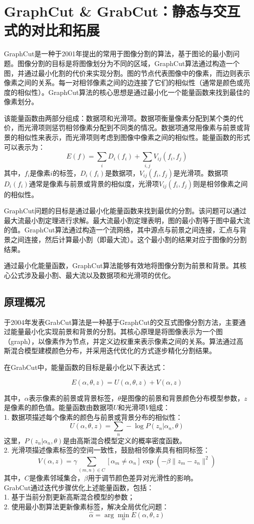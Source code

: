 \documentclass[UTF8]{ctexart}
\begin{document}
\section{GraphCut \& GrabCut：静态与交互式的对比和拓展}
GraphCut是一种于2001年提出的常用于图像分割的算法\cite{boykov_interactive_2001}，基于图论的最小割问题。图像分割的目标是将图像划分为不同的区域，GraphCut算法通过构造一个图，并通过最小化割的代价来实现分割。图的节点代表图像中的像素，而边则表示像素之间的关系。每一对相邻像素之间的边连接了它们的相似性（通常是颜色或亮度的相似性）。GraphCut算法的核心思想是通过最小化一个能量函数来找到最佳的像素划分。\par
该能量函数由两部分组成：数据项和光滑项。数据项衡量像素分配到某个类的代价，而光滑项则惩罚相邻像素分配到不同类的情况。数据项通常用像素与前景或背景的相似性来表示，而光滑项则考虑到图像中像素之间的相似性。能量函数的形式可以表示为：
\[
E(f) = \sum_i D_i(f_i) + \sum_{i,j} V_{ij}(f_i, f_j)
\]
其中，$f_i$是像素$i$的标签，$D_i(f_i)$是数据项，$V_{ij}(f_i, f_j)$是光滑项。数据项$D_i(f_i)$通常是像素与前景或背景的相似度，光滑项$V_{ij}(f_i, f_j)$则是相邻像素之间的相似性。\par
GraphCut问题的目标是通过最小化能量函数来找到最优的分割。该问题可以通过最大流最小割定理进行求解。最大流最小割定理表明，图的最小割等于图中最大流的值。GraphCut算法通过构造一个流网络，其中源点与前景之间连接，汇点与背景之间连接，然后计算最小割（即最大流）。这个最小割的结果对应于图像的分割结果。\par
通过最小化能量函数，GraphCut算法能够有效地将图像分割为前景和背景。其核心公式涉及最小割、最大流以及数据项和光滑项的优化。
\subsection{原理概况}
于2004年发表GrabCut算法是一种基于GraphCut的交互式图像分割方法\cite{rother_grabcut_2004}，主要通过能量最小化实现前景和背景的分割。其核心原理是将图像表示为一个图（graph），以像素作为节点，并定义边权重来表示像素之间的关系。算法通过高斯混合模型建模颜色分布，并采用迭代优化的方式逐步精化分割结果。\par
在GrabCut中，能量函数的目标是最小化以下表达式：

\[
E(\alpha, \theta, z) = U(\alpha, \theta, z) + V(\alpha, z)
\]

其中，$\alpha$表示像素的前景或背景标签，$\theta$是图像的前景和背景颜色分布模型参数，$z$\\是像素的颜色值。能量函数由数据项$U$和光滑项$V$组成：\\
1. 数据项描述每个像素的颜色与前景或背景分布的相似性：
\[
U(\alpha, \theta, z) = \sum_{n} -\log P(z_n | \alpha_n, \theta)
\]
这里，\(P(z_n | \alpha_n, \theta)\)是由高斯混合模型定义的概率密度函数。\\
2. 光滑项描述像素标签的空间一致性，鼓励相邻像素具有相同标签：
\[
V(\alpha, z) = \gamma \sum_{(m,n)\in C} [\alpha_m \neq \alpha_n] \exp(-\beta \|z_m - z_n\|^2)
\]
其中，\(C\)是像素邻域集合，\(\beta\)用于调节颜色差异对光滑性的影响。\\
GrabCut通过迭代步骤优化上述能量函数，包括：\\
1. 基于当前分割更新高斯混合模型的参数；\\
2. 使用最小割算法更新像素标签，解决全局优化问题：
\[
\hat{\alpha} = \arg\min_{\alpha} E(\alpha, \theta, z)
\]
\end{document}
